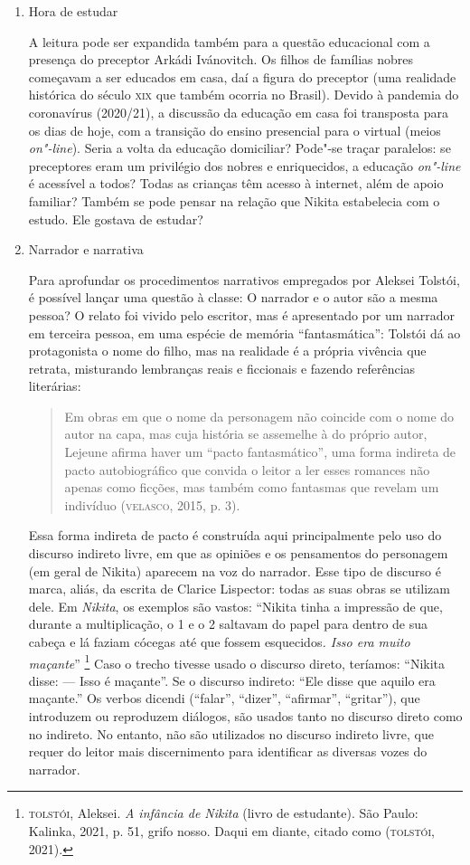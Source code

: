 \documentclass[11pt]{extarticle}
\begin{document}
\begin{enumerate}
\item
Hora de estudar

A leitura pode ser expandida também para a questão educacional com a
presença do preceptor Arkádi Ivánovitch. Os filhos de famílias nobres
começavam a ser educados em casa, daí a figura do preceptor (uma
realidade histórica do século \textsc{xix} que também ocorria no Brasil). Devido
à pandemia do coronavírus (2020/21), a discussão da educação em casa foi
transposta para os dias de hoje, com a transição do ensino presencial
para o virtual (meios \emph{on"-line}). Seria a volta da educação
domiciliar? Pode"-se traçar paralelos: se preceptores eram um privilégio
dos nobres e enriquecidos, a educação \emph{on"-line} é acessível a
todos? Todas as crianças têm acesso à internet, além de apoio familiar?
Também se pode pensar na relação que Nikita estabelecia com o estudo.
Ele gostava de estudar?

\item
Narrador e narrativa

Para aprofundar os procedimentos narrativos empregados por Aleksei
Tolstói, é possível lançar uma questão à classe: O narrador e o autor
são a mesma pessoa? O relato foi vivido pelo escritor, mas é apresentado
por um narrador em terceira pessoa, em uma espécie de memória
``fantasmática'': Tolstói dá ao protagonista o nome do filho, mas na
realidade é a própria vivência que retrata, misturando lembranças reais
e ficcionais e fazendo referências literárias:

\begin{quote}
Em obras em que o nome da personagem não coincide com o nome do autor na
capa, mas cuja história se assemelhe à do próprio autor, Lejeune afirma
haver um ``pacto fantasmático'', uma forma indireta de pacto
autobiográfico que convida o leitor a ler esses romances não apenas como
ficções, mas também como fantasmas que revelam um indivíduo
(\textsc{velasco}, 2015, p. 3).
\end{quote}

Essa forma indireta de pacto é construída aqui principalmente pelo uso
do discurso indireto livre, em que as opiniões e os pensamentos do
personagem (em geral de Nikita) aparecem na voz do narrador. Esse tipo
de discurso é marca, aliás, da escrita de Clarice Lispector: todas as
suas obras se utilizam dele. Em \emph{Nikita}, os exemplos são vastos:
``Nikita tinha a impressão de que, durante a multiplicação, o 1 e o 2
saltavam do papel para dentro de sua cabeça e lá faziam cócegas até que
fossem esquecidos\emph{. Isso era muito maçante}'' \footnote{\textsc{tolstói}, Aleksei. \emph{A infância de Nikita} (livro de estudante). São Paulo: Kalinka, 2021, p. 51, grifo nosso. Daqui em diante, citado como (\textsc{tolstói}, 2021).} Caso o trecho tivesse usado o discurso direto,
teríamos: ``Nikita disse: --- Isso é maçante''. Se o discurso indireto:
``Ele disse que aquilo era maçante.'' Os verbos dicendi (``falar'',
``dizer'', ``afirmar'', ``gritar''), que introduzem ou reproduzem
diálogos, são usados tanto no discurso direto como no indireto. No entanto, 
não são utilizados no discurso indireto livre, que requer do leitor mais
discernimento para identificar as diversas vozes do narrador.


\end{enumerate}
\end{document}

